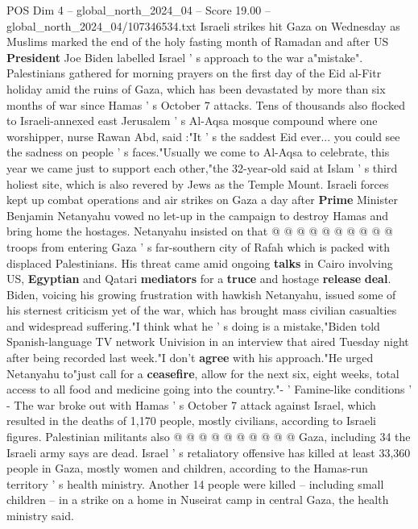 \begin{textsample}{POS Dim 4 – global\_north\_2024\_04 – Score 19.00 – global\_north\_2024\_04/107346534.txt}  \label{ex:f4_pos_365}
Israeli strikes hit Gaza on Wednesday as Muslims marked the end of the holy fasting month of Ramadan and after US \textbf{President} Joe Biden labelled Israel ' s approach to the war a"mistake".
Palestinians gathered for morning prayers on the first day of the Eid al-Fitr holiday amid the ruins of Gaza, which has been devastated by more than six months of war since Hamas ' s October 7 attacks.
Tens of thousands also flocked to Israeli-annexed east Jerusalem ' s Al-Aqsa mosque compound where one worshipper, nurse Rawan Abd, said :"It ' s the saddest Eid ever... you could see the sadness on people ' s faces."Usually we come to Al-Aqsa to celebrate, this year we came just to support each other,"the 32-year-old said at Islam ' s third holiest site, which is also revered by Jews as the Temple Mount.
Israeli forces kept up combat operations and air strikes on Gaza a day after \textbf{Prime} Minister Benjamin Netanyahu vowed no let-up in the campaign to destroy Hamas and bring home the hostages.
Netanyahu insisted on that @ @ @ @ @ @ @ @ @ @ troops from entering Gaza ' s far-southern city of Rafah which is packed with displaced Palestinians.
His threat came amid ongoing \textbf{talks} in Cairo involving US, \textbf{Egyptian} and Qatari \textbf{mediators} for a \textbf{truce} and hostage \textbf{release} \textbf{deal}.
Biden, voicing his growing frustration with hawkish Netanyahu, issued some of his sternest criticism yet of the war, which has brought mass civilian casualties and widespread suffering."I think what he ' s doing is a mistake,"Biden told Spanish-language TV network Univision in an interview that aired Tuesday night after being recorded last week."I don't \textbf{agree} with his approach."He urged Netanyahu to"just call for a \textbf{ceasefire}, allow for the next six, eight weeks, total access to all food and medicine going into the country."- ' Famine-like conditions ' - The war broke out with Hamas ' s October 7 attack against Israel, which resulted in the deaths of 1,170 people, mostly civilians, according to Israeli figures.
Palestinian militants also @ @ @ @ @ @ @ @ @ @ Gaza, including 34 the Israeli army says are dead.
Israel ' s retaliatory offensive has killed at least 33,360 people in Gaza, mostly women and children, according to the Hamas-run territory ' s health ministry.
Another 14 people were killed -- including small children -- in a strike on a home in Nuseirat camp in central Gaza, the health ministry said.

\end{textsample}
